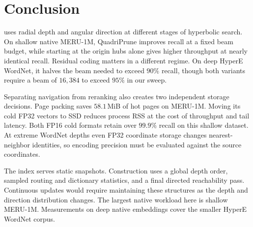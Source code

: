 \section{Conclusion}
\label{sec:conclusion}

\rquiver{} uses radial depth and angular direction at different stages of hyperbolic search. On shallow native {MERU-1M}, QuadriPrune improves recall at a fixed beam budget, while starting at the origin hubs alone gives higher throughput at nearly identical recall. Residual coding matters in a different regime. On deep {HyperE WordNet}, it halves the beam needed to exceed $90\%$ recall, though both variants require a beam of $16{,}384$ to exceed $95\%$ in our sweep.

Separating navigation from reranking also creates two independent storage decisions. Page packing saves $58.1$\,MiB of hot pages on {MERU-1M}. Moving its cold FP32 vectors to SSD reduces process RSS at the cost of throughput and tail latency. Both FP16 cold formats retain over $99.9\%$ recall on this shallow dataset. At extreme WordNet depths even FP32 coordinate storage changes nearest-neighbor identities, so encoding precision must be evaluated against the source coordinates.

The index serves static snapshots. Construction uses a global depth order, sampled routing and dictionary statistics, and a final directed reachability pass. Continuous updates would require maintaining these structures as the depth and direction distribution changes. The largest native workload here is shallow {MERU-1M}. Measurements on deep native embeddings cover the smaller {HyperE WordNet} corpus.
